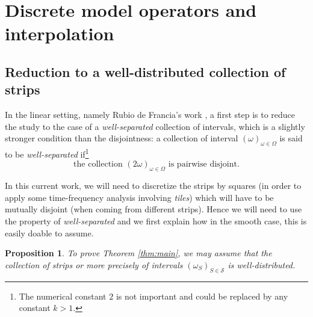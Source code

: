 \documentclass[a4paper,11pt,oneside]{amsart}
\theoremstyle{plain}
\newtheorem{proposition}[theorem]{Proposition}
\theoremstyle{definition}
\begin{document}
\section{Discrete model operators and interpolation}

\subsection{Reduction to a well-distributed collection of strips}

In the linear setting, namely Rubio de Francia's work \cite{RF}, a first step is to reduce the study to the case of a {\it well-separated} collection of intervals, which is a slightly stronger condition than the disjointness: a collection of interval $(\omega)_{\omega\in \Omega}$ is said to be {\it well-separated} if\footnote{The numerical constant $2$ is not important and could be replaced by any constant $k>1$.}
$$ \textrm{the collection $(2\omega)_{\omega\in\Omega}$ is pairwise disjoint.}$$

In this current work, we will need to discretize the strips by squares (in order to apply some time-frequency analysis involving {\it tiles}) which will have to be mutually disjoint (when coming from different strips). Hence we will need to use the property of {\it well-separated} and we first explain how in the smooth case, this is easily doable to assume.


\begin{proposition} To prove Theorem \ref{thm:main}, we may assume that the collection of strips or more precisely of intervals $(\omega_S)_{S\in{\mathcal S}}$ is {\it well-distributed}.
\end{proposition}
\end{document}
